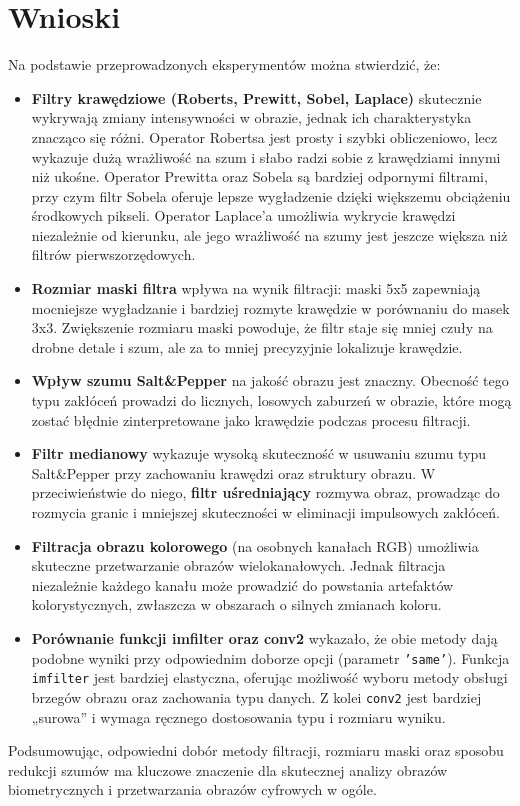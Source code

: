 \section{Wnioski}
Na podstawie przeprowadzonych eksperymentów można stwierdzić, że:

\begin{itemize}
	\item \textbf{Filtry krawędziowe (Roberts, Prewitt, Sobel, Laplace)} skutecznie wykrywają zmiany intensywności w obrazie, jednak ich charakterystyka znacząco się różni. Operator Robertsa jest prosty i szybki obliczeniowo, lecz wykazuje dużą wrażliwość na szum i słabo radzi sobie z krawędziami innymi niż ukośne. Operator Prewitta oraz Sobela są bardziej odpornymi filtrami, przy czym filtr Sobela oferuje lepsze wygładzenie dzięki większemu obciążeniu środkowych pikseli. Operator Laplace’a umożliwia wykrycie krawędzi niezależnie od kierunku, ale jego wrażliwość na szumy jest jeszcze większa niż filtrów pierwszorzędowych.
	
	\item \textbf{Rozmiar maski filtra} wpływa na wynik filtracji: maski 5x5 zapewniają mocniejsze wygładzanie i bardziej rozmyte krawędzie w porównaniu do masek 3x3. Zwiększenie rozmiaru maski powoduje, że filtr staje się mniej czuły na drobne detale i szum, ale za to mniej precyzyjnie lokalizuje krawędzie.
	
	\item \textbf{Wpływ szumu Salt\&Pepper} na jakość obrazu jest znaczny. Obecność tego typu zakłóceń prowadzi do licznych, losowych zaburzeń w obrazie, które mogą zostać błędnie zinterpretowane jako krawędzie podczas procesu filtracji.
	
	\item \textbf{Filtr medianowy} wykazuje wysoką skuteczność w usuwaniu szumu typu Salt\&Pepper przy zachowaniu krawędzi oraz struktury obrazu. W przeciwieństwie do niego, \textbf{filtr uśredniający} rozmywa obraz, prowadząc do rozmycia granic i mniejszej skuteczności w eliminacji impulsowych zakłóceń.
	
	\item \textbf{Filtracja obrazu kolorowego} (na osobnych kanałach RGB) umożliwia skuteczne przetwarzanie obrazów wielokanałowych. Jednak filtracja niezależnie każdego kanału może prowadzić do powstania artefaktów kolorystycznych, zwłaszcza w obszarach o silnych zmianach koloru.
	
	\item \textbf{Porównanie funkcji imfilter oraz conv2} wykazało, że obie metody dają podobne wyniki przy odpowiednim doborze opcji (parametr \texttt{'same'}). Funkcja \texttt{imfilter} jest bardziej elastyczna, oferując możliwość wyboru metody obsługi brzegów obrazu oraz zachowania typu danych. Z kolei \texttt{conv2} jest bardziej „surowa” i wymaga ręcznego dostosowania typu i rozmiaru wyniku.
\end{itemize}

Podsumowując, odpowiedni dobór metody filtracji, rozmiaru maski oraz sposobu redukcji szumów ma kluczowe znaczenie dla skutecznej analizy obrazów biometrycznych i przetwarzania obrazów cyfrowych w ogóle.
